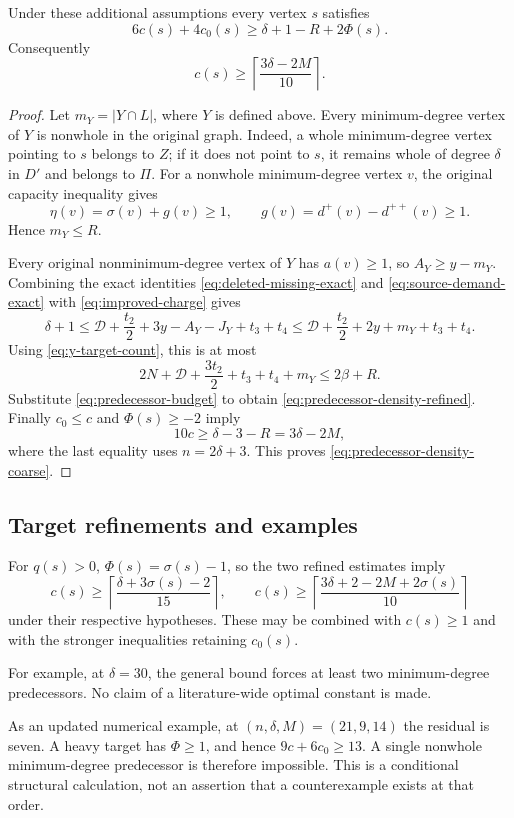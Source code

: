 \begin{theorem}\label{thm:predecessor-density}
Under these additional assumptions every vertex $s$ satisfies
\begin{equation}\label{eq:predecessor-density-refined}
 {6c(s)+4c_0(s)\ge\delta+1-R+2\Phi(s).}
\end{equation}
Consequently
\begin{equation}\label{eq:predecessor-density-coarse}
 c(s)\ge\left\lceil\frac{3\delta-2M}{10}\right\rceil.
\end{equation}
\end{theorem}
\begin{proof}
Let $m_Y=|Y\cap L|$, where $Y$ is defined above.  Every minimum-degree
vertex of $Y$ is nonwhole in the original graph.  Indeed, a whole
minimum-degree vertex pointing to $s$ belongs to $Z$; if it does not
point to $s$, it remains whole of degree $\delta$ in $D'$ and belongs
to $\Pi$.  For a nonwhole minimum-degree vertex $v$, the original
capacity inequality gives
\[
 \eta(v)=\sigma(v)+g(v)\ge1,
 \qquad g(v)=d^+(v)-d^{++}(v)\ge1.
\]
Hence $m_Y\le R$.

Every original nonminimum-degree vertex of $Y$ has $a(v)\ge1$, so
$A_Y\ge y-m_Y$.  Combining the exact identities
\eqref{eq:deleted-missing-exact} and
\eqref{eq:source-demand-exact} with \eqref{eq:improved-charge} gives
\[
 \delta+1
 \le\mathcal D+\frac{t_2}{2}+3y-A_Y-J_Y+t_3+t_4
 \le\mathcal D+\frac{t_2}{2}+2y+m_Y+t_3+t_4.
\]
Using \eqref{eq:y-target-count}, this is at most
\[
 2N+\mathcal D+\frac{3t_2}{2}+t_3+t_4+m_Y
 \le2\beta+R.
\]
Substitute \eqref{eq:predecessor-budget} to obtain
\eqref{eq:predecessor-density-refined}.  Finally $c_0\le c$ and
$\Phi(s)\ge-2$ imply
\[
 10c\ge\delta-3-R=3\delta-2M,
\]
where the last equality uses $n=2\delta+3$.  This proves
\eqref{eq:predecessor-density-coarse}.
\end{proof}

\subsection{Target refinements and examples}

For $q(s)>0$, $\Phi(s)=\sigma(s)-1$, so the two refined estimates
imply
\[
 c(s)\ge\left\lceil\frac{\delta+3\sigma(s)-2}{15}\right\rceil,
 \qquad
 c(s)\ge\left\lceil
       \frac{3\delta+2-2M+2\sigma(s)}{10}\right\rceil
\]
under their respective hypotheses.  These may be combined with
$c(s)\ge1$ and with the stronger inequalities retaining $c_0(s)$.

For example, at $\delta=30$, the general bound forces at least two
minimum-degree predecessors. No claim of a literature-wide optimal constant
is made.


As an updated numerical example, at $(n,\delta,M)=(21,9,14)$ the
residual is seven. A heavy target has $\Phi\ge1$, and hence
$9c+6c_0\ge13$. A single nonwhole minimum-degree predecessor is
therefore impossible. This is a conditional structural calculation,
not an assertion that a counterexample exists at that order.
